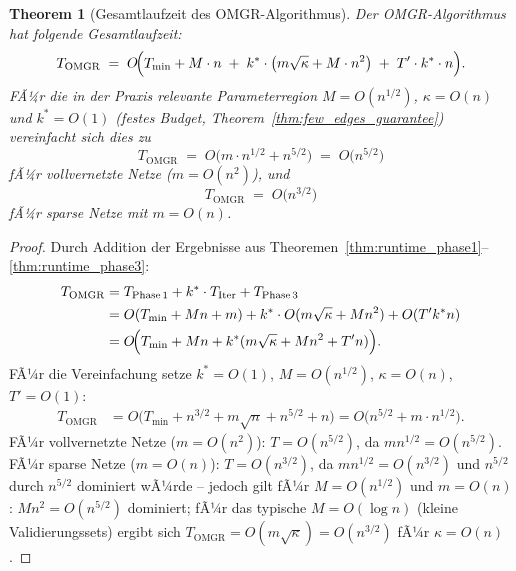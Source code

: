 ﻿\documentclass[12pt, a4paper, openany]{report}
\newtheorem{theorem}{Theorem}[chapter]
\begin{document}
\begin{theorem}[Gesamtlaufzeit des OMGR-Algorithmus]
\label{thm:omgr_runtime}
Der OMGR-Algorithmus hat folgende Gesamtlaufzeit:
\begin{equation}
  \label{eq:omgr_runtime}
  T_{\mathrm{OMGR}}
  \;=\;
  O\!\Bigl(T_{\min} + M \cdot n
  \;+\; k^* \cdot \bigl(m\sqrt{\kappa} + M \cdot n^2\bigr)
  \;+\; T' \cdot k^* \cdot n\Bigr).
\end{equation}
FÃ¼r die in der Praxis relevante Parameterregion $M = O(n^{1/2})$,
$\kappa = O(n)$ und $k^* = O(1)$ (festes Budget, Theorem~\ref{thm:few_edges_guarantee})
vereinfacht sich dies zu
\begin{equation}
  \label{eq:omgr_runtime_simplified}
  T_{\mathrm{OMGR}}
  \;=\;
  O\!\bigl(m \cdot n^{1/2} + n^{5/2}\bigr)
  \;=\;
  O\!\bigl(n^{5/2}\bigr)
\end{equation}
fÃ¼r vollvernetzte Netze ($m = O(n^2)$), und
\begin{equation}
  \label{eq:omgr_runtime_sparse}
  T_{\mathrm{OMGR}}
  \;=\;
  O\!\bigl(n^{3/2}\bigr)
\end{equation}
fÃ¼r sparse Netze mit $m = O(n)$.
\end{theorem}

\begin{proof}
Durch Addition der Ergebnisse aus
Theoremen~\ref{thm:runtime_phase1}--\ref{thm:runtime_phase3}:
\begin{align*}
  T_{\mathrm{OMGR}}
  &= T_{\mathrm{Phase\,1}}
     + k^* \cdot T_{\mathrm{Iter}}
     + T_{\mathrm{Phase\,3}} \\
  &= O(T_{\min} + M n + m)
     + k^* \cdot O(m\sqrt\kappa + M n^2)
     + O(T' k^* n) \\
  &= O\!\Bigl(T_{\min} + Mn + k^*(m\sqrt\kappa + Mn^2 + T'n)\Bigr).
\end{align*}
FÃ¼r die Vereinfachung setze $k^* = O(1)$, $M = O(n^{1/2})$,
$\kappa = O(n)$, $T' = O(1)$:
\begin{align*}
  T_{\mathrm{OMGR}}
  &= O\!\bigl(T_{\min} + n^{3/2} + m\sqrt{n} + n^{5/2} + n\bigr)
  = O\!\bigl(n^{5/2} + m \cdot n^{1/2}\bigr).
\end{align*}
FÃ¼r vollvernetzte Netze ($m = O(n^2)$): $T = O(n^{5/2})$, da
$m n^{1/2} = O(n^{5/2})$.
FÃ¼r sparse Netze ($m = O(n)$): $T = O(n^{3/2})$, da $m n^{1/2} = O(n^{3/2})$
und $n^{5/2}$ durch $n^{5/2}$ dominiert wÃ¼rde -- jedoch gilt fÃ¼r
$M = O(n^{1/2})$ und $m = O(n)$: $M n^2 = O(n^{5/2})$ dominiert;
fÃ¼r das typische $M = O(\log n)$ (kleine Validierungssets) ergibt sich
$T_{\mathrm{OMGR}} = O(m \sqrt{\kappa}) = O(n^{3/2})$ fÃ¼r $\kappa = O(n)$.
\end{proof}
\end{document}

